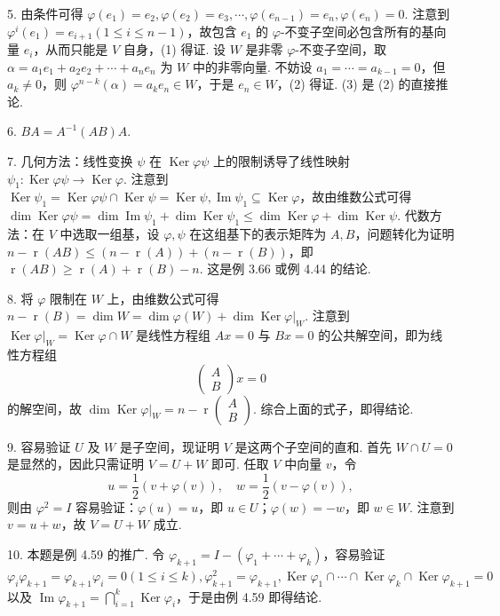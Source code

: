 \documentclass[UTF8, 12pt, fontset=fandol, oneside]{ctexart}
\begin{document}
5. 由条件可得 $\varphi(e_1)=e_2,\varphi(e_2)=e_3,\cdots,\varphi(e_{n-1})=e_n,\varphi(e_n)=0$. 注意到 $\varphi^i(e_1)=e_{i+1}(1\le i\le n-1)$，故包含 $e_1$ 的 $\varphi$-不变子空间必包含所有的基向量 $e_i$，从而只能是 $V$ 自身，(1) 得证. 设 $W$ 是非零 $\varphi$-不变子空间，取 $\alpha=a_1e_1+a_2e_2+\cdots+a_ne_n$ 为 $W$ 中的非零向量. 不妨设 $a_1=\cdots=a_{k-1}=0$，但 $a_k\ne0$，则 $\varphi^{n-k}(\alpha)=a_ke_n\in W$，于是 $e_n\in W$，(2) 得证. (3) 是 (2) 的直接推论.

6. $BA=A^{-1}(AB)A$.

7. 几何方法：线性变换 $\psi$ 在 $\operatorname{Ker}\varphi\psi$ 上的限制诱导了线性映射 $\psi_1:\operatorname{Ker}\varphi\psi\to\operatorname{Ker}\varphi$. 注意到 $\operatorname{Ker}\psi_1=\operatorname{Ker}\varphi\psi\cap\operatorname{Ker}\psi=\operatorname{Ker}\psi,\operatorname{Im}\psi_1\subseteq\operatorname{Ker}\varphi$，故由维数公式可得 $\dim\operatorname{Ker}\varphi\psi=\dim\operatorname{Im}\psi_1+\dim\operatorname{Ker}\psi_1\le\dim\operatorname{Ker}\varphi+\dim\operatorname{Ker}\psi$. 代数方法：在 $V$ 中选取一组基，设 $\varphi,\psi$ 在这组基下的表示矩阵为 $A,B$，问题转化为证明 $n-\operatorname{r}(AB)\le(n-\operatorname{r}(A))+(n-\operatorname{r}(B))$，即 $\operatorname{r}(AB)\ge\operatorname{r}(A)+\operatorname{r}(B)-n$. 这是例 3.66 或例 4.44 的结论.

8. 将 $\varphi$ 限制在 $W$ 上，由维数公式可得 $n-\operatorname{r}(B)=\dim W=\dim\varphi(W)+\dim\operatorname{Ker}\varphi|_W$. 注意到 $\operatorname{Ker}\varphi|_W=\operatorname{Ker}\varphi\cap W$ 是线性方程组 $Ax=0$ 与 $Bx=0$ 的公共解空间，即为线性方程组
\[
\left(\begin{array}{c}A\\B\end{array}\right)x=0
\]
的解空间，故 $\dim\operatorname{Ker}\varphi|_W=n-\operatorname{r}\left(\begin{array}{c}A\\B\end{array}\right)$. 综合上面的式子，即得结论.

9. 容易验证 $U$ 及 $W$ 是子空间，现证明 $V$ 是这两个子空间的直和. 首先 $W\cap U=0$ 是显然的，因此只需证明 $V=U+W$ 即可. 任取 $V$ 中向量 $v$，令
\[
u=\frac12(v+\varphi(v)),\quad w=\frac12(v-\varphi(v)),
\]
则由 $\varphi^2=I$ 容易验证：$\varphi(u)=u$，即 $u\in U$；$\varphi(w)=-w$，即 $w\in W$. 注意到 $v=u+w$，故
 $V=U+W$ 成立.

10. 本题是例 4.59 的推广. 令 $\varphi_{k+1}=I-(\varphi_1+\cdots+\varphi_k)$，容易验证 $\varphi_i\varphi_{k+1}=\varphi_{k+1}\varphi_i=0(1\le i\le k),\varphi_{k+1}^2=\varphi_{k+1},\operatorname{Ker}\varphi_1\cap\cdots\cap\operatorname{Ker}\varphi_k\cap\operatorname{Ker}\varphi_{k+1}=0$ 以及 $\operatorname{Im}\varphi_{k+1}=\bigcap_{i=1}^k\operatorname{Ker}\varphi_i$，于是由例 4.59 即得结论.
\end{document}
